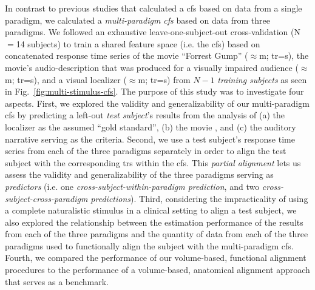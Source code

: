 In contrast to previous studies \citep[e.g.][]{jiahui2020predicting,
guntupalli2016model, haxby2011common} that calculated a \ac{cfs} based on data
from a single paradigm, we calculated a \textit{multi-paradigm \ac{cfs}} based
on data from three paradigms.
We followed an exhaustive leave-one-subject-out cross-validation (N$=$14
subjects) to train a shared feature space (i.e. the \ac{cfs}) based on
concatenated response time series of
%
the movie ``Forrest Gump'' ($\approx$\unit[120]{m}; \ac{tr}=\unit[2]{s}),
%
the movie's audio-description  that was produced for a visually impaired
audience ($\approx$\unit[120]{m}; \ac{tr}=\unit[2]{s}), and
%
a visual localizer ($\approx$\unit[21]{m}; \ac{tr}=\unit[2]{s})
%
from $N-1$ \textit{training subjects} as seen in
Fig.~\ref{fig:multi-stimulus-cfs}.
The purpose of this study was to investigate four aspects.
%
First, we explored the validity and generalizability of our multi-paradigm
\ac{cfs} by predicting a left-out \textit{test subject}'s results from the
analysis of
%
(a) the localizer \citep{sengupta2016extension} as the assumed ``gold
standard'',
%
(b) the movie \citep{haeusler2022processing}, and
%
(c) the auditory narrative \citep{haeusler2022processing}
%
serving as the criteria.
Second, we use a test subject's response time series from each of the three
paradigms separately in order to align the test subject with the corresponding
\acp{tr} within the \ac{cfs}.
%
This \textit{partial alignment} lets us assess the validity and generalizability
of the three paradigms serving as \textit{predictors} (i.e. one
\textit{cross-subject-within-paradigm prediction}, and two
\textit{cross-subject-cross-paradigm predictions}).
Third, considering the impracticality of using a complete naturalistic stimulus
in a clinical setting to align a test subject, we also explored the relationship
between the estimation performance of the results from each of the three
paradigms and the quantity of data from each of the three paradigms used to
functionally align the subject with the multi-paradigm \ac{cfs}.
Fourth, we compared the performance of our volume-based, functional alignment
procedures to the performance of a volume-based, anatomical alignment approach
that serves as a benchmark.

%

